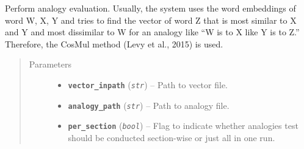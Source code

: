 \documentclass[letterpaper,10pt,english]{sphinxmanual}
\begin{document}
\begin{fulllineitems}
\label{src.eval:src.eval.analogy.analogy_eval}
Perform analogy evaluation. Usually, the system uses the word embeddings of word W, X, Y and tries to find the
vector of word Z that is most similar to
X and Y and most dissimilar to W for an analogy like ``W is to X like Y is to Z.''
Therefore, the CosMul method (Levy et al., 2015) is used.
\begin{quote}\begin{description}
\item[{Parameters}] \leavevmode\begin{itemize}
\item {} 
\textbf{\texttt{vector\_inpath}} (\emph{\texttt{str}}) -- Path to  vector file.

\item {} 
\textbf{\texttt{analogy\_path}} (\emph{\texttt{str}}) -- Path to analogy file.

\item {} 
\textbf{\texttt{per\_section}} (\emph{\texttt{bool}}) -- Flag to indicate whether analogies test should be conducted section-wise or just all in
one run.

\end{itemize}

\end{description}\end{quote}

\end{fulllineitems}

\end{document}
